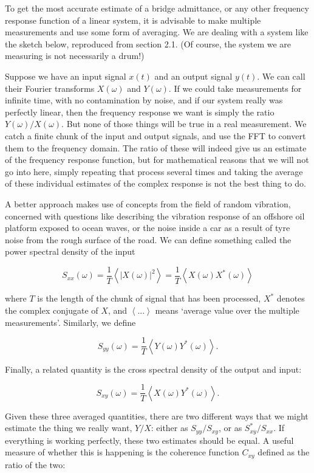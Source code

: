   To get the most accurate estimate of a bridge admittance, or any other 
  frequency response function of a linear system, it is advisable to make 
  multiple measurements and use some form of averaging. We are dealing with a 
  system like the sketch below, reproduced from section 2.1. (Of course, the 
  system we are measuring is not necessarily a drum!) 

  Suppose we have an input signal $x(t)$ and an output signal $y(t)$. We can 
  call their Fourier transforms $X(\omega)$ and $Y(\omega)$. If we could take 
  measurements for infinite time, with no contamination by noise, and if our 
  system really was perfectly linear, then the frequency response we want is 
  simply the ratio $Y(\omega)/X(\omega)$. But none of those things will be true 
  in a real measurement. We catch a finite chunk of the input and output 
  signals, and use the FFT to convert them to the frequency domain. The ratio 
  of these will indeed give us an estimate of the frequency response function, 
  but for mathematical reasons that we will not go into here, simply repeating 
  that process several times and taking the average of these individual 
  estimates of the complex response is not the best thing to do. 

  A better approach makes use of concepts from the field of random vibration, 
  concerned with questions like describing the vibration response of an 
  offshore oil platform exposed to ocean waves, or the noise inside a car as a 
  result of tyre noise from the rough surface of the road. We can define 
  something called the power spectral density of the input 

  $$S_{xx}(\omega) = \frac{1}{T}\left<|X(\omega)|^2 \right> = 
  \frac{1}{T}\left<X(\omega) X^*(\omega)\right> \tag{1}$$ 

  where $T$ is the length of the chunk of signal that has been processed, $X^*$ 
  denotes the complex conjugate of $X$, and $\left< ... \right>$ means `average 
  value over the multiple measurements'. Similarly, we define 

  $$S_{yy}(\omega) = \frac{1}{T}\left<Y(\omega) Y^*(\omega)\right> .\tag{2}$$ 

  Finally, a related quantity is the cross spectral density of the output and 
  input: 

  $$S_{xy}(\omega) = \frac{1}{T}\left<X(\omega) Y^*(\omega)\right> .\tag{3}$$ 

  Given these three averaged quantities, there are two different ways that we 
  might estimate the thing we really want, $Y/X$: either as $S_{yy}/S_{xy}$, or 
  as $S^*_{xy}/S_{xx}$. If everything is working perfectly, these two estimates 
  should be equal. A useful measure of whether this is happening is the 
  coherence function $C_{xy}$ defined as the ratio of the two: 

